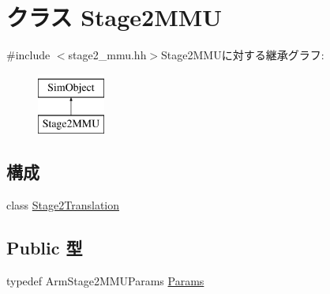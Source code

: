 \hypertarget{classArmISA_1_1Stage2MMU}{
\section{クラス Stage2MMU}
\label{classArmISA_1_1Stage2MMU}
}


{\ttfamily \#include $<$stage2\_\-mmu.hh$>$}Stage2MMUに対する継承グラフ:\begin{figure}[H]
\begin{center}
\leavevmode
\includegraphics[height=2cm]{classArmISA_1_1Stage2MMU}
\end{center}
\end{figure}
\subsection*{構成}
\begin{DoxyCompactItemize}
\item 
class \hyperlink{classArmISA_1_1Stage2MMU_1_1Stage2Translation}{Stage2Translation}
\end{DoxyCompactItemize}
\subsection*{Public 型}
\begin{DoxyCompactItemize}
\item 
typedef ArmStage2MMUParams \hyperlink{classArmISA_1_1Stage2MMU_a50e2496d982576d92f9f4df1918b73e0}{Params}
\end{DoxyCompactItemize}
